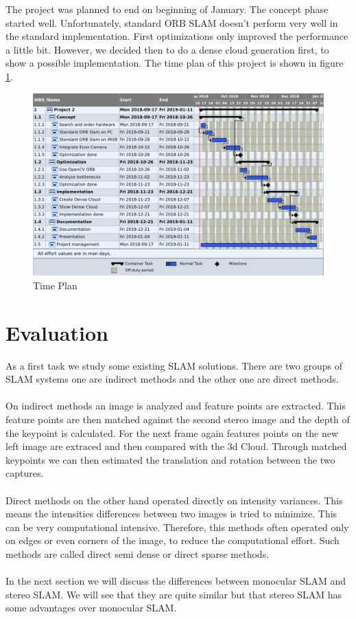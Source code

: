 \documentclass[11pt,a4paper,titlepage,oneside]{report}
\begin{document}
The project was planned to end on beginning of January. The concept phase started well. Unfortunately, standard ORB SLAM doesn't perform very well in the standard implementation. First optimizations only improved the performance a little bit. However, we decided then to do a dense cloud generation first, to show a possible implementation. The time plan of this project is shown in figure \ref{fig:timeplan}.
\begin{figure}[H]
	\includegraphics[width=1.0\textwidth]{img/timeplan.png}
	\caption{Time Plan}\label{fig:timeplan}
\end{figure}

\chapter{Evaluation}

As a first task we study some existing SLAM solutions. There are two groups of SLAM systems one are indirect methods and the other one are direct methods.\\\\
On indirect methods an image is analyzed and feature points are extracted. This feature points are then matched against the second stereo image and the depth of the keypoint is calculated. For the next frame again features points on the new left image are extraced and then compared with the 3d Cloud. Through matched keypoints we can then estimated the translation and rotation between the two captures.\\\\
Direct methods on the other hand operated directly on intensity variances. This means the intensities differences between two images is tried to minimize. This can be very computational intensive. Therefore, this methods often operated only on edges or even corners of the image, to reduce the computational effort. Such methods are called direct semi dense or direct sparse methods.\\\\
In the next section we will discuss the differences between monocular SLAM and stereo SLAM. We will see that they are quite similar but that stereo SLAM has some advantages over monocular SLAM.
\end{document}
